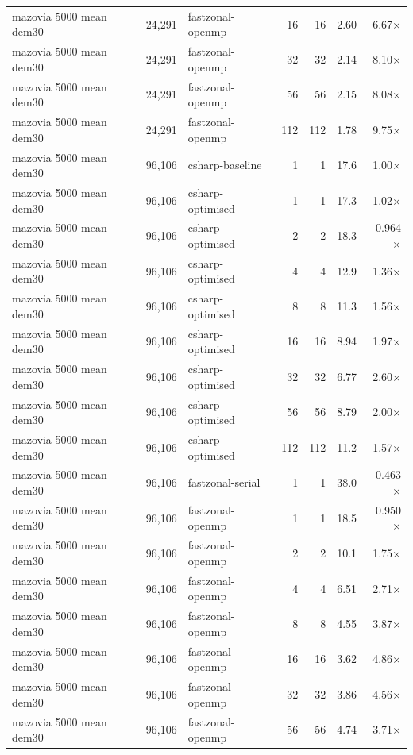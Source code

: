 \begin{tabular}{lrlrrrr}
mazovia 5000 mean dem30 & 24,291 & fastzonal-openmp & 16 & 16 & 2.60 & 6.67$\times$ \\
mazovia 5000 mean dem30 & 24,291 & fastzonal-openmp & 32 & 32 & 2.14 & 8.10$\times$ \\
mazovia 5000 mean dem30 & 24,291 & fastzonal-openmp & 56 & 56 & 2.15 & 8.08$\times$ \\
mazovia 5000 mean dem30 & 24,291 & fastzonal-openmp & 112 & 112 & 1.78 & 9.75$\times$ \\
mazovia 5000 mean dem30 & 96,106 & csharp-baseline & 1 & 1 & 17.6 & 1.00$\times$ \\
mazovia 5000 mean dem30 & 96,106 & csharp-optimised & 1 & 1 & 17.3 & 1.02$\times$ \\
mazovia 5000 mean dem30 & 96,106 & csharp-optimised & 2 & 2 & 18.3 & 0.964$\times$ \\
mazovia 5000 mean dem30 & 96,106 & csharp-optimised & 4 & 4 & 12.9 & 1.36$\times$ \\
mazovia 5000 mean dem30 & 96,106 & csharp-optimised & 8 & 8 & 11.3 & 1.56$\times$ \\
mazovia 5000 mean dem30 & 96,106 & csharp-optimised & 16 & 16 & 8.94 & 1.97$\times$ \\
mazovia 5000 mean dem30 & 96,106 & csharp-optimised & 32 & 32 & 6.77 & 2.60$\times$ \\
mazovia 5000 mean dem30 & 96,106 & csharp-optimised & 56 & 56 & 8.79 & 2.00$\times$ \\
mazovia 5000 mean dem30 & 96,106 & csharp-optimised & 112 & 112 & 11.2 & 1.57$\times$ \\
mazovia 5000 mean dem30 & 96,106 & fastzonal-serial & 1 & 1 & 38.0 & 0.463$\times$ \\
mazovia 5000 mean dem30 & 96,106 & fastzonal-openmp & 1 & 1 & 18.5 & 0.950$\times$ \\
mazovia 5000 mean dem30 & 96,106 & fastzonal-openmp & 2 & 2 & 10.1 & 1.75$\times$ \\
mazovia 5000 mean dem30 & 96,106 & fastzonal-openmp & 4 & 4 & 6.51 & 2.71$\times$ \\
mazovia 5000 mean dem30 & 96,106 & fastzonal-openmp & 8 & 8 & 4.55 & 3.87$\times$ \\
mazovia 5000 mean dem30 & 96,106 & fastzonal-openmp & 16 & 16 & 3.62 & 4.86$\times$ \\
mazovia 5000 mean dem30 & 96,106 & fastzonal-openmp & 32 & 32 & 3.86 & 4.56$\times$ \\
mazovia 5000 mean dem30 & 96,106 & fastzonal-openmp & 56 & 56 & 4.74 & 3.71$\times$ \\

\end{tabular}
